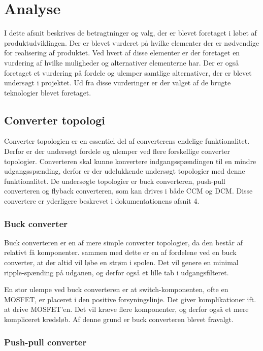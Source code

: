 
\chapter{Analyse}
I dette afsnit beskrives de betragtninger og valg, der er blevet foretaget i løbet af produktudviklingen. Der er blevet vurderet på hvilke elementer der er nødvendige for realisering af produktet. Ved hvert af disse elementer er der foretaget en vurdering af hvilke muligheder og alternativer elementerne har. Der er også foretaget et vurdering på fordele og ulemper samtlige alternativer, der er blevet undersøgt i projektet. Ud fra disse vurderinger er der valget af de brugte teknologier blevet foretaget. 

\section{Converter topologi}
Converter topologien er en essentiel del af converterens endelige funktionalitet. Derfor er der undersøgt fordele og ulemper ved flere forskellige converter topologier. Converteren skal kunne konvertere indgangsspændingen til en mindre udgangsspænding, derfor er der udelukkende undersøgt topologier med denne funktionalitet. De undersøgte topologier er buck converteren, push-pull converteren og flyback converteren, som kan drives i både CCM og DCM. Disse convertere er yderligere beskrevet i dokumentationens afsnit 4.

\subsection{Buck converter}
Buck converteren er en af mere simple converter topologier, da den består af relativt få komponenter. sammen med dette er en af fordelene ved en buck converter, at der altid vil løbe en strøm i spolen. Det vil genere en minimal ripple-spænding på udganen, og derfor også et lille tab i udgangsfilteret. 

En stor ulempe ved buck converteren er at switch-komponenten, ofte en MOSFET, er placeret i den positive forsyningslinje. Det giver komplikationer ift. at drive MOSFET'en. Det vil kræve flere komponenter, og derfor også et mere kompliceret kredsløb. Af denne grund er buck converteren blevet fravalgt\cite{buck-converter}.

\subsection{Push-pull converter}

